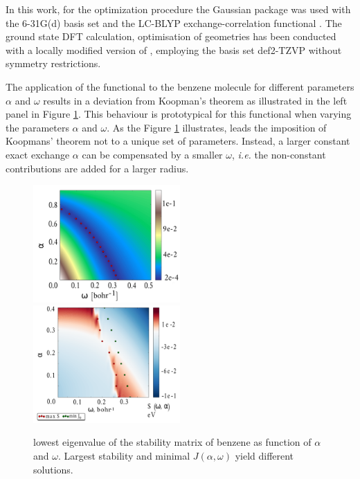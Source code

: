 In this work, for the optimization procedure the Gaussian package  \cite{g09} was used with the 6-31G(d) \cite{6-31g,6-31gd} basis set and the LC-BLYP exchange-correlation functional \cite{lcblyp}. 
The ground state DFT calculation, optimisation of geometries has been conducted with a locally modified version of  \cite{nwchem}, employing the basis set def2-TZVP \cite{def2tzvp} without symmetry restrictions.

The application of the functional  to the benzene molecule for different parameters $\alpha$ and $\omega$ results in a deviation from Koopman's theorem as illustrated in the left panel in Figure \ref{fig:Benzotrsh}.
This behaviour is prototypical for this functional when varying the parameters $\alpha$ and $\omega$.
As the Figure \ref{fig:Benzotrsh} illustrates, leads the imposition of Koopmans' theorem not to a unique set of parameters.
Instead, a larger constant exact exchange $\alpha$ can be compensated by a smaller $\omega$, \textit{i.e.} the non-constant contributions are added for a larger radius.
\begin{figure}
\includegraphics[width=0.5\textwidth]{Figures/Benzene/benzene2D}
\includegraphics[width=0.5\textwidth]{Figures/Benzene/benzene_S_stab_ion_cut_all.pdf}
\caption{lowest eigenvalue of the stability matrix of benzene as function of $\alpha$ and $\omega$. Largest stability and minimal $J(\alpha, \omega)$ yield different solutions.}
\label{fig:Benzotrsh}
\end{figure}
